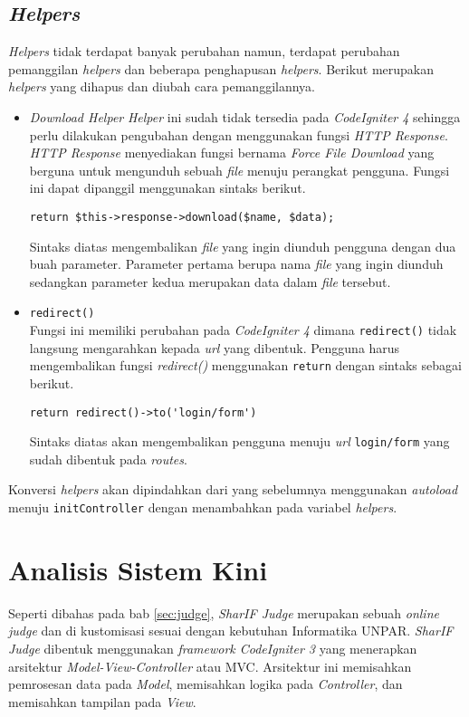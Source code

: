 \subsection{\textit{Helpers}}
\textit{Helpers} tidak terdapat banyak perubahan namun, terdapat perubahan pemanggilan \textit{helpers} dan beberapa penghapusan \textit{helpers}. Berikut merupakan \textit{helpers} yang dihapus dan diubah cara pemanggilannya.
\begin{itemize}
\item \textit{Download Helper}
\textit{Helper} ini sudah tidak tersedia pada \textit{CodeIgniter 4} sehingga perlu dilakukan pengubahan dengan menggunakan fungsi \textit{HTTP Response}. \textit{HTTP Response} menyediakan fungsi bernama \textit{Force File Download} yang berguna untuk mengunduh sebuah \textit{file} menuju perangkat pengguna. Fungsi ini dapat dipanggil menggunakan sintaks berikut.

\begin{center}
 \verb|return $this->response->download($name, $data);|
\end{center}

Sintaks diatas mengembalikan \textit{file} yang ingin diunduh pengguna dengan dua buah parameter. Parameter pertama berupa nama \textit{file} yang ingin diunduh sedangkan parameter kedua merupakan data dalam \textit{file} tersebut.

\item \texttt{redirect()} \\
Fungsi ini memiliki perubahan pada \textit{CodeIgniter 4} dimana \texttt{redirect()} tidak langsung mengarahkan kepada \textit{url} yang dibentuk. Pengguna harus mengembalikan fungsi \textit{redirect()} menggunakan \texttt{return} dengan sintaks sebagai berikut.
\begin{center}
 \verb|return redirect()->to('login/form')|
\end{center} 

Sintaks diatas akan mengembalikan pengguna menuju \textit{url} \texttt{login/form} yang sudah dibentuk pada \textit{routes}.

\end{itemize}

Konversi \textit{helpers} akan dipindahkan dari yang sebelumnya menggunakan \textit{autoload} menuju \texttt{initController} dengan menambahkan pada variabel \textit{helpers}.

\section{Analisis Sistem Kini}
Seperti dibahas pada bab \ref{sec:judge}, \textit{SharIF Judge} merupakan sebuah \textit{online judge} dan di kustomisasi sesuai dengan kebutuhan Informatika UNPAR. \textit{SharIF Judge} dibentuk menggunakan \textit{framework CodeIgniter 3} yang menerapkan  arsitektur \textit{Model-View-Controller} atau MVC. Arsitektur ini memisahkan pemrosesan data pada \textit{Model}, memisahkan logika pada \textit{Controller}, dan memisahkan tampilan pada \textit{View}.

